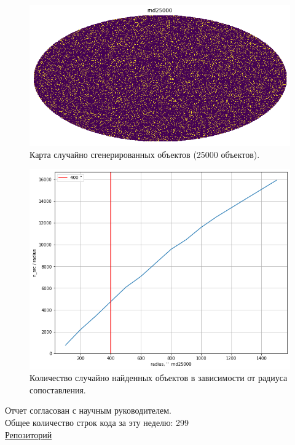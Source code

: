 \documentclass{article}
\begin{document}
\begin{figure}[h]
\includegraphics[width=0.7\linewidth]{rnd_map}
\caption{Карта случайно сгенерированных объектов (25000 объектов).}
\label{Fig:Rnd_map}
\end{figure}

\begin{figure}[h]
\includegraphics[width=0.6\linewidth]{rnd}
\caption{Количество случайно найденных объектов в зависимости от радиуса сопоставления.}
\label{Fig:Rnd}
\end{figure}

Отчет согласован с научным руководителем.\\
Общее количество строк кода за эту неделю: 299\\
\href{https://github.com/rt2122/data-segmentation-2}{Репозиторий}\\ 
\end{document}
